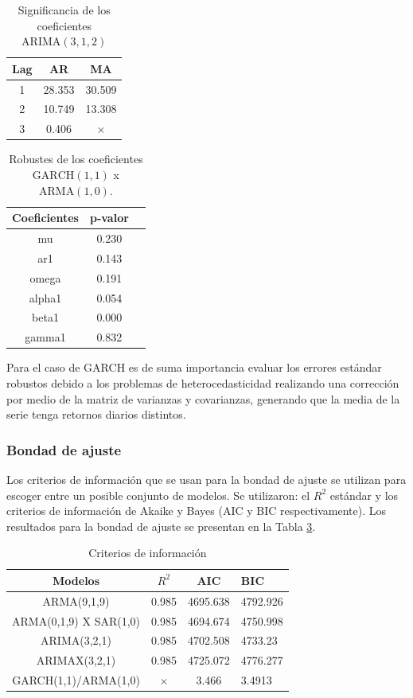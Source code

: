 \documentclass[conference]{IEEEtran}
\begin{document}
\begin{table}
\centering
\caption{Significancia de los coeficientes  $\mathrm{ARIMA}(3,1,2)$}
\label{tab:sg_arima312}
\begin{tabular}{ccc}
\hline
\textbf{Lag} &\textbf{AR} & \textbf{MA} \\ \hline
1 & 28.353 & 30.509\\
2 & 10.749 & 13.308\\
3 & 0.406& $\times$ \\
\hline
\end{tabular}
\end{table}

\begin{table}
\centering
\caption{Robustes de los coeficientes  $\mathrm{GARCH(1,1)}$ x $\mathrm{ARMA(1,0)}$.}
\label{tab:sg_garch11arma10}
\begin{tabular}{ccc}
\hline
\textbf{Coeficientes} &\textbf{p-valor} \\ \hline
mu & 0.230 \\
ar1 & 0.143 \\
omega & 0.191 \\
alpha1 & 0.054 \\
beta1 & 0.000 \\
gamma1 & 0.832\\
\hline
\end{tabular}
\end{table}
Para el caso de GARCH es de suma importancia evaluar los errores estándar robustos debido a los problemas de heterocedasticidad realizando una corrección por medio de la matriz de varianzas y covarianzas, generando que la media de la serie tenga retornos diarios distintos.

\subsubsection{Bondad de ajuste} Los criterios de información que se usan para la bondad de ajuste se utilizan para escoger entre un posible conjunto de modelos. Se utilizaron: el $R^2$ estándar y los criterios de información de Akaike y Bayes (AIC y BIC respectivamente). Los resultados para la bondad de ajuste se presentan en la Tabla \ref{tab:tablabondadA}.
\begin{table}
\centering
\caption{Criterios de información}
\label{tab:tablabondadA}
\begin{tabular}{cccl}
\hline
\textbf{Modelos} & $R^2$ & \textbf{AIC} & \textbf{BIC} \\ \hline
ARMA(9,1,9) & 0.985 & 4695.638 & 4792.926 \\
ARMA(0,1,9) X SAR(1,0) & 0.985 & 4694.674 & 4750.998 \\
ARIMA(3,2,1) & 0.985 & 4702.508 & 4733.23 \\
ARIMAX(3,2,1) & 0.985 & 4725.072 & 4776.277\\
GARCH(1,1)/ARMA(1,0) & $\times$ & 3.466 & 3.4913
\\ \hline
\end{tabular}
\end{table}
\end{document}
